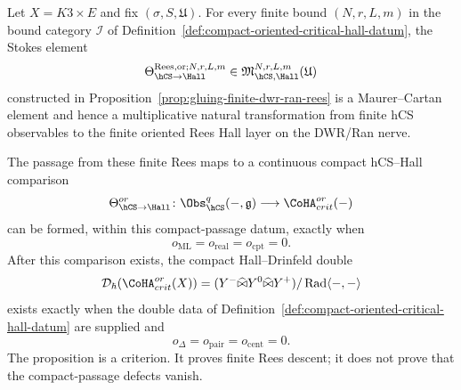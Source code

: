 \begin{proposition}
\label{prop:finite-rees-gluing-exact-compact-obstructions}
\label{thm:compact-oriented-critical-hall-cosheaf-criterion}
Let $X=K3\times E$ and fix $(\sigma,S,\mathfrak U)$. For every finite
bound $(N,r,L,m)$ in the bound category $\mathcal I$ of
Definition~\ref{def:compact-oriented-critical-hall-datum}, the Stokes
element
\[
 \Theta_{\hCS\to\Hall}^{\mathrm{Rees},\mathrm{or};N,r,L,m}
 \in
 \mathfrak M_{\hCS,\Hall}^{N,r,L,m}(\mathfrak U)
\]
constructed in Proposition~\ref{prop:gluing-finite-dwr-ran-rees} is a
Maurer--Cartan element and hence a multiplicative natural
transformation from finite hCS observables to the finite oriented Rees
Hall layer on the DWR/Ran nerve.

The passage from these finite Rees maps to a continuous compact
hCS--Hall comparison
\[
 \Theta^{or}_{\hCS\to\Hall}\colon
 \Obs^q_{\hCS}(-,\mathfrak g)
 \longrightarrow
 \CoHA^{or}_{crit}(-)
\]
can be formed, within this compact-passage datum, exactly when
\[
 o_{\mathrm{ML}}=o_{\mathrm{real}}=o_{\mathrm{cpt}}=0.
\]
After this comparison exists, the compact Hall--Drinfeld double
\[
 \mathcal D_\hbar(\CoHA^{or}_{crit}(X))
 =
 (Y^-\widehat\bowtie Y^0\widehat\bowtie Y^+)/
 \operatorname{Rad}\langle-,-\rangle
\]
exists exactly when the double data of
Definition~\ref{def:compact-oriented-critical-hall-datum} are supplied
and
\[
 o_\Delta=o_{\mathrm{pair}}=o_{\mathrm{cent}}=0.
\]
The proposition is a criterion. It proves finite Rees descent; it does
not prove that the compact-passage defects vanish.
\end{proposition}

